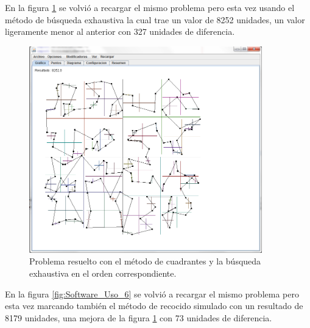 \hspace*{1cm}En la figura \ref {fig:Software_Uso_5} se volvió a recargar el mismo problema pero esta vez usando el método de búsqueda exhaustiva la cual trae un valor de 8252 unidades, un valor ligeramente menor al anterior con 327 unidades de diferencia.\\

    \begin{figure}[hbtp]
        \centering
            \includegraphics[width=0.9\textwidth]{Software/Imagenes/Software_Uso_5.png}
            \caption{Problema resuelto con el método de cuadrantes y la búsqueda exhaustiva en el orden correspondiente.}
            \label{fig:Software_Uso_5}
    \end{figure}
\clearpage \newpage

\hspace*{1cm}En la figura \ref {fig:Software_Uso_6} se volvió a recargar el mismo problema pero esta vez marcando también el método de recocido simulado con un resultado de 8179 unidades, una mejora de la figura \ref {fig:Software_Uso_5} con 73 unidades de diferencia.\\

